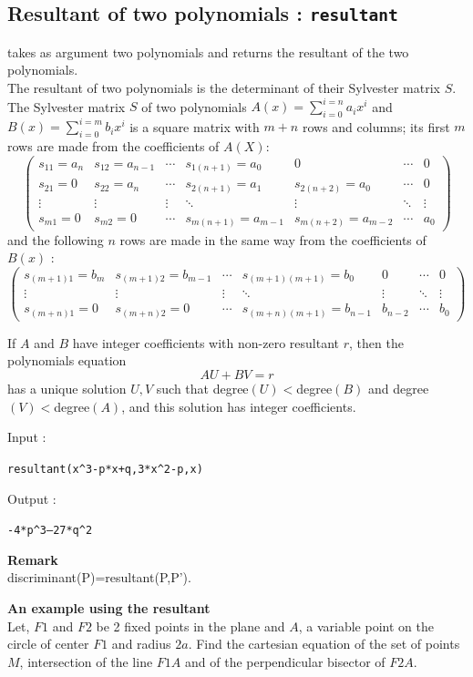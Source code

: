 \documentclass[a4paper,11pt]{book}
\begin{document}
\subsection{Resultant of two polynomials : {\tt resultant}}
 takes as argument two polynomials and
returns the resultant of the two polynomials.\\
The resultant of two polynomials is the determinant of their
Sylvester matrix $S$. 
The Sylvester matrix $S$ of two polynomials $A(x)=\sum_{i=0}^{i=n} a_ix^i$
and $B(x)=\sum_{i=0}^{i=m} b_ix^i$
is a square matrix with $m+n$ rows and columns; its first $m$ rows
are made from the coefficients of $A(X)$:
$$\left(\begin{array}{ccccccc}
s_{11}=a_n & s_{12}=a_{n-1}& \cdots & s_{1(n+1)}=a_0 & 0 & \cdots & 0\\
s_{21}=0 & s_{22}=a_{n}& \cdots & s_{2(n+1)}=a_1 & s_{2(n+2)}=a_0 & \cdots & 0\\
\vdots &\vdots &\vdots &\ddots &\vdots &\ddots &\vdots\\
s_{m1}=0 & s_{m2}=0& \cdots & s_{m(n+1)}=a_{m-1} & s_{m(n+2)}=a_{m-2} & \cdots&a_0 
\end{array}\right)$$
and the following $n$ rows are made in the same way from the
coefficients of $B(x)$ :
$$\left(\begin{array}{ccccccc}
s_{(m+1)1}=b_m & s_{(m+1)2}=b_{m-1}& \cdots & s_{(m+1)(m+1)}=b_0 & 0 & \cdots & 0\\
\vdots &\vdots &\vdots &\ddots &\vdots &\ddots &\vdots\\
s_{(m+n)1}=0 & s_{(m+n)2}=0& \cdots & s_{(m+n)(m+1)}=b_{n-1}  & b_{n-2}  &\cdots&b_0 
\end{array}\right)$$

If $A$ and $B$ have integer coefficients with non-zero resultant $r$, 
then the polynomials equation 
\[ AU+BV=r\]
has a unique solution $U,V$ such that degree$(U)<$degree$(B)$ and 
degree$(V)<$degree$(A)$, and this solution has integer coefficients.

Input :
\begin{center}{\tt resultant(x\verb|^|3-p*x+q,3*x\verb|^|2-p,x)}\end{center}
Output :
\begin{center}{\tt -4*p\verb|^|3--27*q\verb|^|2}\end{center}
{\bf Remark}\\
discriminant(P)=resultant(P,P').

{\bf An example using the resultant}\\
Let, $F1$ and $F2$ be 2 fixed points in the plane and
$A$, a variable point on the circle of center $F1$ and radius $2a$.
Find the cartesian equation of the set of points $M$, intersection of
the line $F1A$ and of the perpendicular bisector of $F2A$.
\end{document}
